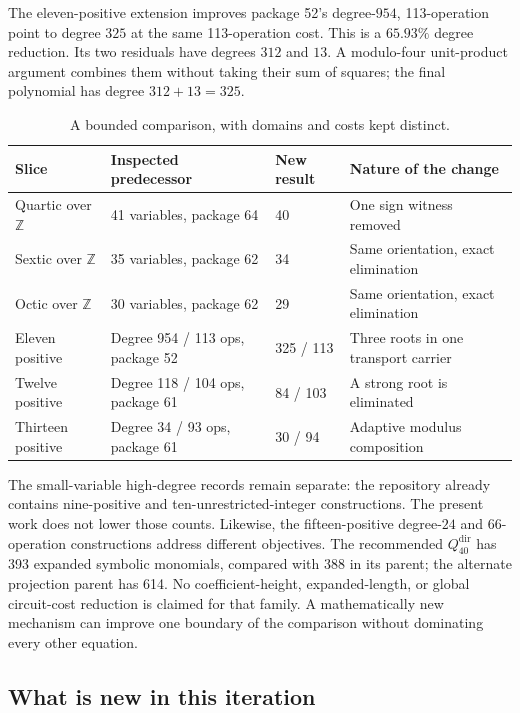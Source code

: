 \documentclass[11pt,letterpaper]{article}
\theoremstyle{remark}
\newcommand{\Z}{\mathbb Z}
\begin{document}
The eleven-positive extension improves package 52's degree-$954$,
113-operation point to degree $325$ at the same 113-operation cost.
This is a $65.93\%$ degree reduction.  Its two residuals have degrees
$312$ and $13$.  A modulo-four unit-product argument combines them
without taking their sum of squares; the final polynomial has degree
$312+13=325$.

\begin{table}[ht]
\centering
\small
\begin{tabular}{@{}lll>{\raggedright\arraybackslash}p{4.0cm}@{}}
\toprule
Slice & Inspected predecessor & New result & Nature of the change\\
\midrule
Quartic over $\Z$ & 41 variables, package 64 & 40 & One sign witness removed\\
Sextic over $\Z$ & 35 variables, package 62 & 34 & Same orientation, exact elimination\\
Octic over $\Z$ & 30 variables, package 62 & 29 & Same orientation, exact elimination\\
Eleven positive & Degree 954 / 113 ops, package 52 & 325 / 113 & Three roots in one transport carrier\\
Twelve positive & Degree 118 / 104 ops, package 61 & 84 / 103 & A strong root is eliminated\\
Thirteen positive & Degree 34 / 93 ops, package 61 & 30 / 94 & Adaptive modulus composition\\
\bottomrule
\end{tabular}
\caption{A bounded comparison, with domains and costs kept distinct.}
\end{table}

The small-variable high-degree records remain separate: the repository
already contains nine-positive and ten-unrestricted-integer constructions.
The present work does not lower those counts.  Likewise, the fifteen-positive
degree-$24$ and 66-operation constructions address different objectives.
The recommended $Q_{40}^{\mathrm{dir}}$ has 393 expanded symbolic monomials, compared
with 388 in its parent; the alternate projection parent has 614.
No coefficient-height, expanded-length, or global circuit-cost reduction
is claimed for that family.  A mathematically new mechanism can improve
one boundary of the comparison without dominating every other equation.

\subsection{What is new in this iteration}
\end{document}
